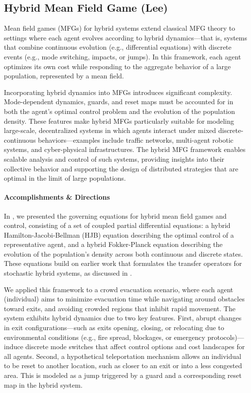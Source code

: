 \documentclass[letterpaper,11pt]{article}
\begin{document}
\subsection{Hybrid Mean Field Game (Lee)}\label{sec:hybrid_MFG}

Mean field games (MFGs) for hybrid systems extend classical MFG theory to settings where each agent evolves according to hybrid dynamics—that is, systems that combine continuous evolution (e.g., differential equations) with discrete events (e.g., mode switching, impacts, or jumps).
In this framework, each agent optimizes its own cost while responding to the aggregate behavior of a large population, represented by a mean field.

Incorporating hybrid dynamics into MFGs introduces significant complexity.
Mode-dependent dynamics, guards, and reset maps must be accounted for in both the agent’s optimal control problem and the evolution of the population density.
These features make hybrid MFGs particularly suitable for modeling large-scale, decentralized systems in which agents interact under mixed discrete-continuous behaviors—examples include traffic networks, multi-agent robotic systems, and cyber-physical infrastructures.
The hybrid MFG framework enables scalable analysis and control of such systems, providing insights into their collective behavior and supporting the design of distributed strategies that are optimal in the limit of large populations.

\paragraph{Accomplishments \& Directions}

In \cite{CLeePISNCS25}, we presented the governing equations for hybrid mean field games and control, consisting of a set of coupled partial differential equations: a hybrid Hamilton-Jacobi-Bellman (HJB) equation describing the optimal control of a representative agent, and a hybrid Fokker-Planck equation describing the evolution of the population’s density across both continuous and discrete states.
These equations build on earlier work that formulates the transfer operators for stochastic hybrid systems, as discussed in .

We applied this framework to a crowd evacuation scenario, where each agent (individual) aims to minimize evacuation time while navigating around obstacles toward exits, and avoiding crowded regions that inhibit rapid movement.
The system exhibits hybrid dynamics due to two key features.
First, abrupt changes in exit configurations—such as exits opening, closing, or relocating due to environmental conditions (e.g., fire spread, blockages, or emergency protocols)—induce discrete mode switches that affect control options and cost landscapes for all agents.
Second, a hypothetical teleportation mechanism allows an individual to be reset to another location, such as closer to an exit or into a less congested area.
This is modeled as a jump triggered by a guard and a corresponding reset map in the hybrid system.
\end{document}
